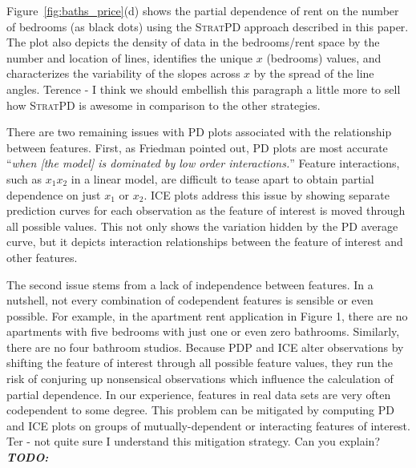 \documentclass[12pt]{article}
\newcommand{\figref}[1]{Figure~\ref{#1}}
\newcommand{\cut}[1]{}
\newcommand{\todo}[1]{{\bf\em TODO:} {{\color{red}{#1}}}}
\newcommand{\spd}{\fontfamily{cmr}\textsc{\small StratPD}}
\begin{document}
\figref{fig:baths_price}(d) shows the partial dependence of rent on the number of bedrooms (as black dots) using the \spd{} approach described in this paper. The plot also depicts the density of data in the bedrooms/rent space by the number and location of lines, identifies the unique $x$ (bedrooms) values, and characterizes the variability of the slopes across $x$ by the spread of the line angles. {\color{red} Terence - I think we should embellish this paragraph a little more to sell how \spd{} is awesome in comparison to the other strategies.}

There are two remaining issues with PD plots associated with the relationship between features. First, as Friedman pointed out, PD plots are most accurate ``{\em when {\em [the model]} is dominated by low order interactions.}''  Feature interactions, such as $x_1x_2$ in a linear model, are difficult to tease apart to obtain partial dependence on just $x_1$ or $x_2$. \cut{\todo{James: should we remove this parenthetical? Yep!, described in Section 1} (Feature $x_j^T = (x_{1j}, .., x_{Nj})$ is a column vector of the  $n \times p$ explanatory matrix ${\bf X}$).} ICE plots address this issue by showing separate prediction curves for each observation as the feature of interest is moved through all possible values.  This not only shows the variation hidden by the PD average curve, but it depicts interaction relationships between the feature of interest and other features.

The second issue stems from a lack of independence between features.  In a nutshell, not every combination of codependent features is sensible or even possible. For example, in the apartment rent application in Figure 1, there are no apartments with five bedrooms with just one or even zero bathrooms. Similarly, there are no four bathroom studios. Because PDP and ICE alter observations by shifting the feature of interest through all possible feature values, they run the risk of conjuring up nonsensical observations which influence the calculation of partial dependence. In our experience, features in real data sets are very often codependent to some degree. This problem can be mitigated by computing PD and ICE plots on groups of mutually-dependent or interacting features of interest. {\color{red} Ter - not quite sure I understand this mitigation strategy. Can you explain?} \todo{but could involve identifying subsets and computing lots of combinations and we still might want to know about a single contribution.}
\end{document}
